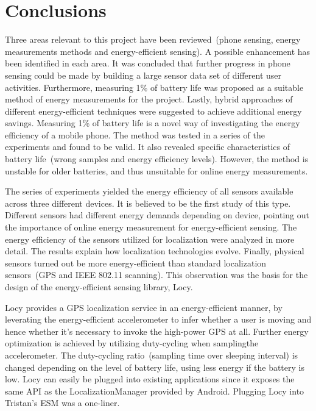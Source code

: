 \section{Conclusions}
\label{s:conc}
Three areas relevant to this project have been reviewed\ (phone sensing, energy measurements methods and energy-efficient sensing). A possible enhancement has been identified in each area. It was concluded that further progress in phone sensing could be made by building a large sensor data set of different user activities. Furthermore, measuring 1\% of battery life was proposed as a suitable method of energy measurements for the project. Lastly, hybrid approaches of different energy-efficient techniques were suggested to achieve additional energy savings. 
Measuring 1\% of battery life is a novel way of investigating the energy efficiency of a mobile phone. The method was tested in a series of the experiments and found to be valid. It also revealed specific characteristics of battery life\ (wrong samples and energy efficiency levels). However, the method is unstable for older batteries, and thus unsuitable for online energy measurements. 		

The series of experiments yielded the energy efficiency of all sensors available across three different devices. It is believed to be the first study of this type. Different sensors had different energy demands depending on device, pointing out the importance of online energy measurement for energy-efficient sensing. The energy efficiency of the sensors utilized for localization were analyzed in more detail. The results explain how localization technologies evolve. Finally, physical sensors turned out be more energy-efficient than standard localization sensors\ (GPS and IEEE 802.11 scanning). This observation was the basis for the design of the energy-efficient sensing library, Locy.

Locy provides a GPS localization service in an energy-efficient manner, by leverating the energy-efficient accelerometer to infer whether a user is moving and hence whether it's necessary to invoke the high-power GPS at all. Further energy optimization is achieved by utilizing duty-cycling when samplingthe accelerometer. The duty-cycling ratio\ (sampling time over sleeping interval) is changed depending on the level of battery life, using less energy if the battery is low. Locy can easily be plugged into existing applications since it exposes the same API as the LocalizationManager provided by Android. Plugging Locy into Tristan's ESM was a one-liner.

